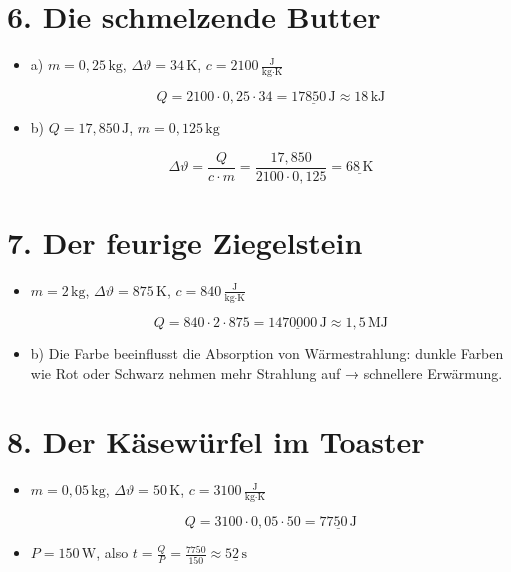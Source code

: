 \documentclass[a4paper]{article}
\begin{document}
\hrulefill

\section*{6. Die schmelzende Butter }

\begin{itemize}
	\item a) \( m = 0{,}25\,\text{kg} \), \( \Delta \vartheta = 34\,\text{K} \), \( c = 2100 \,\frac{\text{J}}{\text{kg}\cdot\text{K}}\)
	
	\[
	Q = 2100 \cdot 0{,}25 \cdot 34 = \underline{17850\,\text{J}}\approx 18 \,\text{kJ}
	\]
	
	\item b) \( Q = 17{,}850\,\text{J} \), \( m = 0{,}125\,\text{kg} \)
	
	\[
	\Delta \vartheta = \frac{Q}{c \cdot m} = \frac{17{,}850}{2100 \cdot 0{,}125} = \underline{68\,\text{K}}
	\]
\end{itemize}

\hrulefill

\section*{7. Der feurige Ziegelstein }

\begin{itemize}
	\item \( m = 2\,\text{kg} \), \( \Delta \vartheta = 875\,\text{K} \), \( c = 840\,\frac{\text{J}}{\text{kg}\cdot\text{K}} \)
	
	\[
	Q = 840 \cdot 2 \cdot 875 = \underline{1470000\,\text{J}}\approx 1,5 \,\text{MJ}
	\]
	
	\item b) Die Farbe beeinflusst die Absorption von Wärmestrahlung: dunkle Farben wie Rot oder Schwarz nehmen mehr Strahlung auf → schnellere Erwärmung.
\end{itemize}

\hrulefill

\section*{8. Der Käsewürfel im Toaster }

\begin{itemize}
	\item \( m = 0{,}05\,\text{kg} \), \( \Delta \vartheta = 50\,\text{K} \), \( c = 3100 \,\frac{\text{J}}{\text{kg}\cdot\text{K}}\)
	
	\[
	Q = 3100 \cdot 0{,}05 \cdot 50 = \underline{7750\,\text{J}}
	\]
	
	\item \( P = 150\,\text{W} \), also \( t = \frac{Q}{P} = \frac{7750}{150} \approx \underline{52\,\text{s}} \)
\end{itemize}
\end{document}
